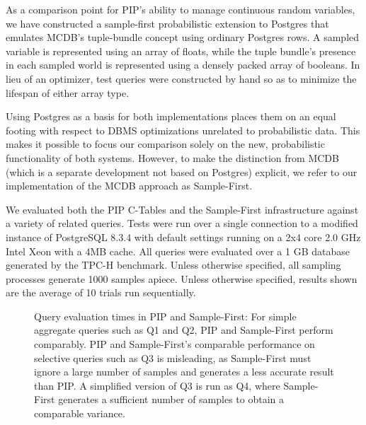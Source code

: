 As a comparison point for PIP's ability to manage continuous random variables, we have constructed a sample-first probabilistic extension to Postgres that emulates MCDB's tuple-bundle concept using ordinary Postgres rows.  A sampled variable is represented using an array of floats, while the tuple bundle's presence in each sampled world is represented using a densely packed array of booleans.  In lieu of an optimizer, test queries were constructed by hand so as to minimize the lifespan of either array type.

Using Postgres as a basis for both implementations places them on an equal footing with respect to DBMS optimizations unrelated to probabilistic data.  This makes it possible to focus our comparison solely on the new, probabilistic functionality of both systems.  However, to make the distinction from MCDB (which is a separate development not based on Postgres) explicit, we refer to our implementation of the MCDB approach as Sample-First.

We evaluated both the PIP C-Tables and the Sample-First infrastructure against a variety of related queries.  Tests were run over a single connection to a modified instance of PostgreSQL 8.3.4 with default settings running on a 2x4 core 2.0 GHz Intel Xeon with a 4MB cache.  All queries were evaluated over a 1 GB database generated by the TPC-H benchmark.  Unless otherwise specified, all sampling processes generate 1000 samples apiece.  Unless otherwise specified, results shown are the average of 10 trials run sequentially.  

\begin{figure}
\begin{center}
\caption{Query evaluation times in PIP and Sample-First: For simple aggregate queries such as Q1 and Q2, PIP and Sample-First perform comparably.  PIP and Sample-First's comparable performance on selective queries such as Q3 is misleading, as Sample-First must ignore a large number of samples and generates a less accurate result than PIP.  A simplified version of Q3 is run as Q4, where Sample-First generates a sufficient number of samples to obtain a comparable variance.}
\label{fig:querytimings}
\end{center}
\end{figure}

